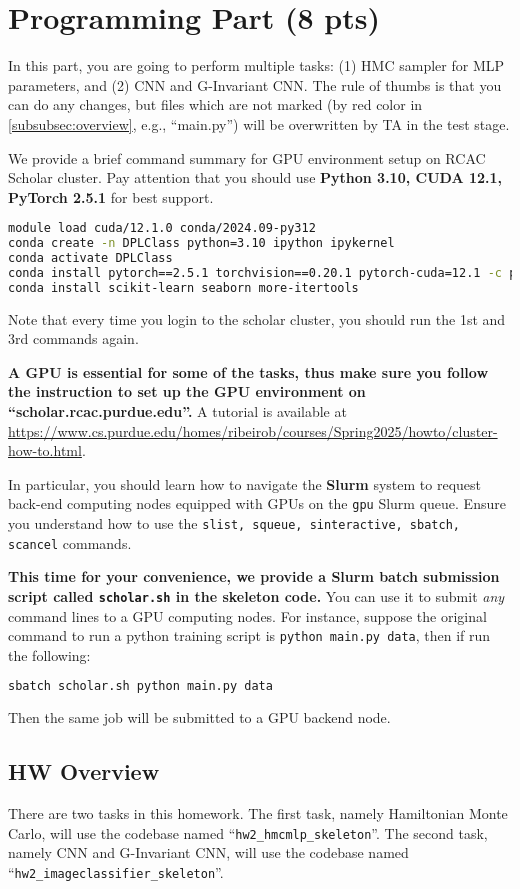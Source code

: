 \section*{Programming Part {\bf (8 pts)}}

In this part, you are going to perform multiple tasks: (1) HMC sampler for MLP parameters, and (2) CNN and G-Invariant CNN.
The rule of thumbs is that you can do any changes, but files which are not
marked (by red color in \ref{subsubsec:overview}, e.g.,
``main.py'') will be overwritten by TA in the test stage.

\hfill

We provide a brief command summary for GPU environment setup on RCAC Scholar cluster.
Pay attention that you should use {\bf Python 3.10, CUDA 12.1, PyTorch 2.5.1} for best support.
\begin{lstlisting}[language=bash, breaklines=true]
module load cuda/12.1.0 conda/2024.09-py312
conda create -n DPLClass python=3.10 ipython ipykernel
conda activate DPLClass
conda install pytorch==2.5.1 torchvision==0.20.1 pytorch-cuda=12.1 -c pytorch -c nvidia
conda install scikit-learn seaborn more-itertools
\end{lstlisting}

Note that every time you login to the scholar cluster, you should run the 1st and 3rd commands again. 

\textbf{A GPU is essential for some of the tasks, thus make sure you follow the instruction to set up the GPU environment on ``scholar.rcac.purdue.edu''.} A tutorial is available at\\
{\scriptsize \url{https://www.cs.purdue.edu/homes/ribeirob/courses/Spring2025/howto/cluster-how-to.html}}.

In particular, you should learn how to navigate the \textbf{Slurm} system to request back-end computing nodes equipped with GPUs on the \texttt{gpu} Slurm queue. Ensure you understand how to use the \texttt{slist, squeue, sinteractive, sbatch, scancel} commands. 

\textbf{This time for your convenience, we provide a Slurm batch submission script called \texttt{scholar.sh} in the skeleton code.} You can use it to submit \emph{any} command lines to a GPU computing nodes. For instance, suppose the original command to run a python training script is \texttt{python main.py data}, then if run the following:
\begin{lstlisting}[language=bash, breaklines=true]
sbatch scholar.sh python main.py data
\end{lstlisting}
Then the same job will be submitted to a GPU backend node. 


\subsection*{HW Overview}
\label{subsubsec:overview}
There are two tasks in this homework. The first task, namely Hamiltonian Monte Carlo, will use the codebase named ``\texttt{hw2\_hmcmlp\_skeleton}''. The second task, namely CNN and G-Invariant CNN, will use the codebase named ``\texttt{hw2\_imageclassifier\_skeleton}''.

\newpage


\newpage


